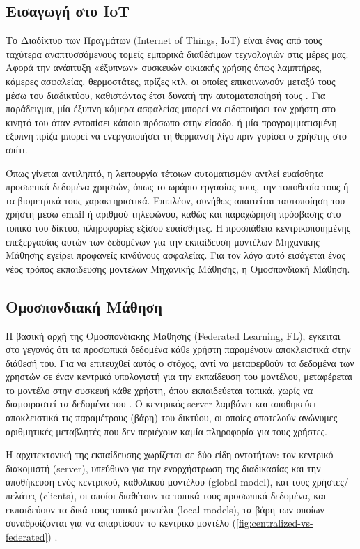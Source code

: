 \subsection{Εισαγωγή στο IoT}\label{ssec:iot}
Το Διαδίκτυο των Πραγμάτων (Internet of Things, IoT) είναι ένας από τους ταχύτερα αναπτυσσόμενους τομείς εμπορικά διαθέσιμων τεχνολογιών στις μέρες μας. Αφορά την ανάπτυξη «έξυπνων» συσκευών οικιακής χρήσης όπως λαμπτήρες, κάμερες ασφαλείας, θερμοστάτες, πρίζες κτλ, οι οποίες επικοινωνούν μεταξύ τους μέσω του διαδικτύου, καθιστώντας έτσι δυνατή την αυτοματοποίησή τους \cite{atzori_internet_2010}. Για παράδειγμα, μία έξυπνη κάμερα ασφαλείας μπορεί να ειδοποιήσει τον χρήστη στο κινητό του όταν εντοπίσει κάποιο πρόσωπο στην είσοδο, ή μία προγραμματισμένη έξυπνη πρίζα μπορεί να ενεργοποιήσει τη θέρμανση λίγο πριν γυρίσει ο χρήστης στο σπίτι.

Όπως γίνεται αντιληπτό, η λειτουργία τέτοιων αυτοματισμών αντλεί ευαίσθητα προσωπικά δεδομένα χρηστών, όπως το ωράριο εργασίας τους, την τοποθεσία τους ή τα βιομετρικά τους χαρακτηριστικά. Επιπλέον, συνήθως απαιτείται ταυτοποίηση του χρήστη μέσω email ή αριθμού τηλεφώνου, καθώς και παραχώρηση πρόσβασης στο τοπικό του δίκτυο, πληροφορίες εξίσου ευαίσθητες. Η προσπάθεια κεντρικοποιημένης επεξεργασίας αυτών των δεδομένων για την εκπαίδευση μοντέλων Μηχανικής Μάθησης εγείρει προφανείς κινδύνους ασφαλείας. Για τον λόγο αυτό εισάγεται ένας νέος τρόπος εκπαίδευσης μοντέλων Μηχανικής Μάθησης, η Ομοσπονδιακή Μάθηση.

\subsection{Ομοσπονδιακή Μάθηση}\label{ssec:fl}
Η βασική αρχή της Ομοσπονδιακής Μάθησης (Federated Learning, FL), έγκειται στο γεγονός ότι τα προσωπικά δεδομένα κάθε χρήστη παραμένουν αποκλειστικά στην διάθεσή του. Για να επιτευχθεί αυτός ο στόχος, αντί να μεταφερθούν τα δεδομένα των χρηστών σε έναν κεντρικό υπολογιστή για την εκπαίδευση του μοντέλου, μεταφέρεται το μοντέλο στην συσκευή κάθε χρήστη, όπου εκπαιδεύεται τοπικά, χωρίς να διαμοιραστεί τα δεδομένα του \cite{mcmahan_communication-efficient_2017}. Ο κεντρικός server λαμβάνει και αποθηκεύει αποκλειστικά τις παραμέτρους (βάρη) του δικτύου, οι οποίες αποτελούν ανώνυμες αριθμητικές μεταβλητές που δεν περιέχουν καμία πληροφορία για τους χρήστες.

Η αρχιτεκτονική της εκπαίδευσης χωρίζεται σε δύο είδη οντοτήτων: τον κεντρικό διακομιστή (server), υπεύθυνο για την ενορχήστρωση της διαδικασίας και την αποθήκευση ενός κεντρικού, καθολικού μοντέλου (global model), και τους χρήστες/πελάτες (clients), οι οποίοι διαθέτουν τα τοπικά τους προσωπικά δεδομένα, και εκπαιδεύουν τα δικά τους τοπικά μοντέλα (local models), τα βάρη των οποίων συναθροίζονται για να απαρτίσουν το κεντρικό μοντέλο (\autoref{fig:centralized-vs-federated}) \cite{yang_federated_2019}.

